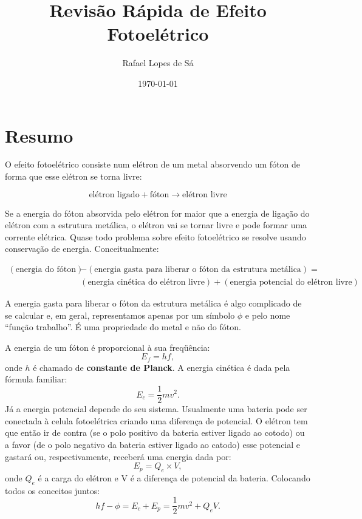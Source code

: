 \documentclass{article}
\title{Revis\~ao R\'apida de Efeito Fotoel\'etrico}
\author{Rafael Lopes de S\'a}
\date{\today}
\begin{document}
\maketitle

\section{Resumo}

O efeito fotoel\'etrico consiste num el\'etron de um metal absorvendo um f\'oton de forma que esse el\'etron se torna livre:

\begin{equation}
\text{el\'etron ligado} + \text{f\'oton} \rightarrow \text{el\'etron livre}
\end{equation}



Se a energia do f\'oton absorvida pelo el\'etron for maior que a energia de liga\c c\~ao do el\'etron com a estrutura met\'alica, o el\'etron vai se tornar livre e pode formar uma corrente el\'etrica. Quase todo problema sobre efeito fotoel\'etrico se resolve usando conserva\c c\~ao de energia. Conceitualmente:

\begin{equation}
\begin{split}
(\text{energia do f\'oton}) &- (\text{energia gasta para liberar o f\'oton da estrutura met\'alica}) = \\
&(\text{energia cin\'etica do el\'etron livre}) + (\text{energia potencial do el\'etron livre})
\end{split}
\end{equation}

A energia gasta para liberar o f\'oton da estrutura met\'alica \'e algo complicado de se calcular e, em geral, representamos apenas por um s\'imbolo $\phi$ e pelo nome ``fun\c c\~ao trabalho''. \'E uma propriedade do metal e n\~ao do f\'oton.

A energia de um f\'oton \'e proporcional \`a sua freq\"u\^encia:
\begin{equation}
E_f = hf,
\end{equation}
onde $h$ \'e chamado de \textbf{constante de Planck}. A energia cin\'etica \'e dada pela f\'ormula familiar:
\begin{equation}
E_c = \frac{1}{2}mv^2.
\end{equation}
J\'a a energia potencial depende do seu sistema. Usualmente uma bateria pode ser conectada \`a celula fotoel\'etrica criando uma diferen\c ca de potencial. O el\'etron tem que ent\~ao ir de contra (se o polo positivo da bateria estiver ligado ao cotodo) ou a favor (de o polo negativo da bateria estiver ligado ao catodo) esse potencial e gastar\'a ou, respectivamente, receber\'a uma energia dada por:
\begin{equation}
E_p = Q_e\times V,
\end{equation}
onde $Q_e$ \'e a carga do el\'etron e V \'e a diferen\c ca de potencial da bateria. Colocando todos os conceitos juntos:
\begin{equation}\label{eq:energia}
hf - \phi = E_c + E_p = \frac{1}{2}mv^2 + Q_eV.
\end{equation}
\end{document}
